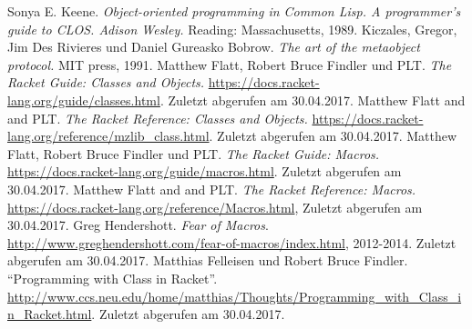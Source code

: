 \begin{thebibliography}{}
  Sonya E. Keene. \emph{Object-oriented programming in Common Lisp. A programmer's guide to CLOS. Adison Wesley.} Reading: Massachusetts, 1989. 
  Kiczales, Gregor, Jim Des Rivieres und Daniel Gureasko Bobrow. \emph{The art of the metaobject protocol.} MIT press, 1991.
  Matthew Flatt, Robert Bruce Findler und PLT. \emph{The Racket Guide: Classes and Objects.} \url{https://docs.racket-lang.org/guide/classes.html}. Zuletzt abgerufen am 30.04.2017.
  Matthew Flatt and and PLT. \emph{The Racket Reference: Classes and Objects.} \url{https://docs.racket-lang.org/reference/mzlib\_class.html}. Zuletzt abgerufen am 30.04.2017.
   Matthew Flatt, Robert Bruce Findler und PLT. \emph{The Racket Guide: Macros.} \url{https://docs.racket-lang.org/guide/macros.html}. Zuletzt abgerufen am 30.04.2017.
  Matthew Flatt and and PLT. \emph{The Racket Reference:  Macros.} \url{https://docs.racket-lang.org/reference/Macros.html}, Zuletzt abgerufen am 30.04.2017.
  Greg Hendershott. \emph{Fear of Macros}.  \\\url{http://www.greghendershott.com/fear-of-macros/index.html}, 2012-2014. Zuletzt abgerufen am 30.04.2017.
  Matthias Felleisen und Robert Bruce Findler. ``Programming with Class in Racket''. \url{http://www.ccs.neu.edu/home/matthias/Thoughts/Programming\_with\_Class\_in\_Racket.html}. Zuletzt abgerufen am 30.04.2017.
\end{thebibliography}

\cleardoublepage